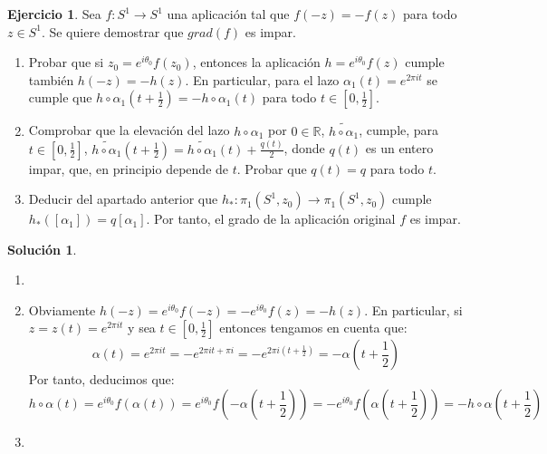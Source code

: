 \documentclass{article}
\theoremstyle{plain}
\theoremstyle{definition}
\newtheorem{exercise}{Ejercicio}
\newtheorem*{sol*}{Solución}
\begin{document}
\newpage

\begin{exercise} \label{grado2} Sea $f: S^1\to S^1$ una aplicaci\'on tal que $f(-z) = -f(z)$ para todo $z\in S^1$. Se quiere demostrar que $grad(f)$ es impar.
\begin{enumerate}
\item Probar que si $z_0 = e^{i\theta_0}f(z_0)$, entonces la aplicaci\'on $h = e^{i\theta_0}f(z)$ cumple tambi\'en $h(-z) = -h(z)$. En particular, para el lazo $\alpha_1(t) = e^{2\pi i t}$  se cumple que $h\circ \alpha_1(t+\frac{1}{2}) = -h \circ \alpha_1(t)$ para todo $t\in [0,\frac{1}{2}]$.

\item Comprobar que la elevaci\'on del lazo $h\circ \alpha_1$ por $0\in \mathbb{R}$,
$\widetilde{h\circ \alpha_1}$, cumple, para $t\in [0,\frac{1}{2}]$, $\widetilde{h\circ \alpha_1}(t+\frac{1}{2}) = \widetilde{h\circ \alpha_1}(t) +\frac{q(t)}{2}$, donde $q(t)$ es un entero impar, que, en principio depende de $t$. Probar que $q(t) = q$ para todo $t$.
\item Deducir del apartado anterior que $h_*: \pi_1(S^1,z_0) \to \pi_1(S^1,z_0)$ cumple $h_* ([\alpha_1]) = q [\alpha_1]$. Por tanto, el grado de la aplicaci\'on original $f$ es impar.

\end{enumerate}
\end{exercise}
\begin{sol*}
\begin{enumerate}
\item[]
\item Obviamente $h(-z) = e^{i\theta_0}f(-z) = -e^{i\theta_0}f(z) = -h(z)$. En particular, si $z=z(t)=e^{2\pi i t}$ y sea $t\in [0,\frac{1}{2}]$ entonces tengamos en cuenta que:
\[
\alpha(t) = e^{2\pi i t} = - e^{2\pi i t + \pi i} = -e^{2\pi i \left(t+\frac{1}{2}\right)}=-\alpha\left(t+\frac{1}{2}\right) 
\]
Por tanto, deducimos que:
\[
h\circ \alpha (t) = e^{i\theta_0}f(\alpha(t)) = e^{i\theta_0}f\left(-\alpha\left(t+\frac{1}{2}\right)\right) = -e^{i\theta_0}f\left(\alpha\left(t+\frac{1}{2}\right)\right)=-h\circ \alpha \left(t+\frac{1}{2}\right) 
\]
\item 
\end{enumerate}
\end{sol*}

\newpage
\end{document}
